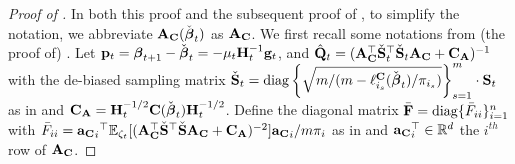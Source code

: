\documentclass[11pt,a4paper]{article}
\begin{document}
\begin{proof}[Proof of ]
In both this proof and the subsequent proof of  , to  simplify the notation, we abbreviate 
$\mathbf{A}_{\mathbf{C}}(\check{\boldsymbol{\beta}}_t)$ as $\mathbf{A}_{\mathbf{C}}$.
We first recall some notations from (the proof of) . 
Let $\mathbf{p}_t=\boldsymbol{\beta}_{t+1}-\check{\boldsymbol{\beta}}_t=-\mu_t\mathbf{H}_t^{-1}\mathbf{g}_t$,  and $\hat {\mathbf{Q}}_t=(\mathbf{A}^\top_{\mathbf{C}}\check{\mathbf{S}}^\top_t\check{\mathbf{S}}_t\mathbf{A}_{\mathbf{C}} +\mathbf{C}_{\mathbf{A}} )^{-1}$ with the de-biased sampling matrix $\check{\mathbf{S}}_t = \operatorname{diag}\left\{\sqrt{  m/(m - \ell^{\mathbf{C}}_{i_s}(\check{\boldsymbol{\beta}}_t)/\pi_{i_s} )} \right \}_{s=1}^m \cdot \mathbf{S}_t$ as in  and  $\mathbf{C}_{\mathbf{A}} =\mathbf{H}_t^{-1/2}\mathbf{C}(\check{\boldsymbol{\beta}}_t)\mathbf{H}_t^{-1/2}$.
Define the diagonal matrix $\bar {\mathbf{F}}=\operatorname{diag}\{\bar F_{ii}\}^n_{i=1}$ with  $\bar F_{ii}={{\mathbf{a}_{\mathbf{C}}}_i}^\top{\mathbb{E}}_{\zeta_t}[(\mathbf{A}_{\mathbf{C}}^\top\check{\mathbf{S}}^\top\check{\mathbf{S}}\mathbf{A}_{\mathbf{C}}+ \mathbf{C}_{\mathbf{A}} )^{-2}]{\mathbf{a}_{\mathbf{C}}}_i/m\pi_i$ as in  and ${\mathbf{a}_{\mathbf{C}}}_i^\top \in{\mathbb{R}}^d$  the $i^{th}$ row of $\mathbf{A}_{\mathbf{C}}$.
  

\end{proof}
\end{document}

